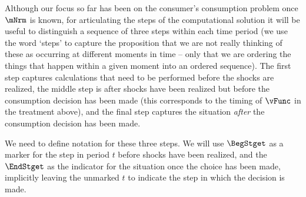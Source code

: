   Although our focus so far has been on the consumer's consumption problem once $\mNrm$ is known, for articulating the steps of the computational solution it will be useful to distinguish a sequence of three steps within each time period (we use the word `steps' to capture the proposition that we are not really thinking of these as occurring at different moments in time -- only that we are ordering the things that happen within a given moment into an ordered sequence).  The first step captures calculations that need to be performed before the shocks are realized, the middle step is after shocks have been realized but before the consumption decision has been made (this corresponds to the timing of $\vFunc$ in the treatment above), and the final step captures the situation \textit{after} the consumption decision has been made.

We need to define notation for these three steps. We will use $\BegStget$ as a marker for the step in period $t$ before shocks have been realized, and the $\EndStget$ as the indicator for the situation once the choice has been made, implicitly leaving the unmarked $t$ to indicate the step in which the decision is made.
